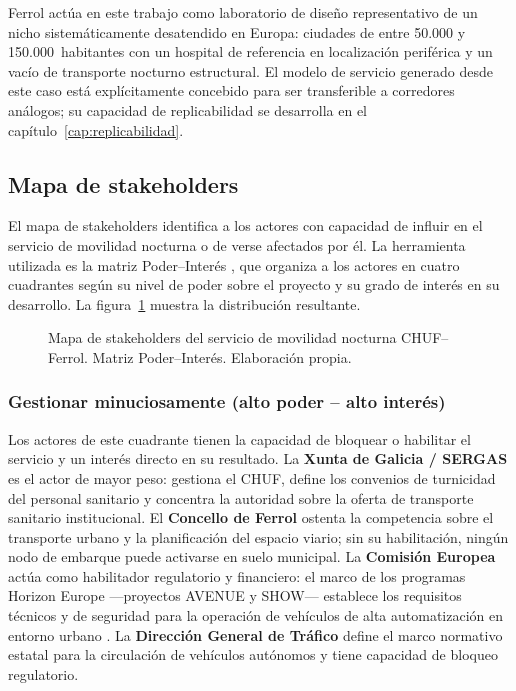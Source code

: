 Ferrol actúa en este trabajo como laboratorio de diseño representativo
de un nicho sistemáticamente desatendido en Europa: ciudades de entre
50.000 y 150.000~habitantes con un hospital de referencia en
localización periférica y un vacío de transporte nocturno estructural.
El modelo de servicio generado desde este caso está explícitamente
concebido para ser transferible a corredores análogos; su capacidad de
replicabilidad se desarrolla en el capítulo~\ref{cap:replicabilidad}.


\subsection{Mapa de stakeholders}
\label{sec:stakeholders}

El mapa de stakeholders identifica a los actores con capacidad de
influir en el servicio de movilidad nocturna o de verse afectados por
él. La herramienta utilizada es la matriz Poder--Interés
\parencite{Mendelow1991}, que organiza a los actores en cuatro cuadrantes según su nivel de poder
sobre el proyecto y su grado de interés en su desarrollo. La
figura~\ref{fig:stakeholder-map} muestra la distribución resultante.

\begin{figure}[htbp]
  \centering
  \fbox{\rule{0pt}{8cm}\rule{0.95\textwidth}{0pt}}
  \caption{Mapa de stakeholders del servicio de movilidad nocturna
    CHUF--Ferrol. Matriz Poder--Interés. Elaboración propia.}
  \label{fig:stakeholder-map}
\end{figure}

\subsubsection{Gestionar minuciosamente (alto poder -- alto interés)}

Los actores de este cuadrante tienen la capacidad de bloquear o
habilitar el servicio y un interés directo en su resultado. La
\textbf{Xunta de Galicia / SERGAS} es el actor de mayor peso: gestiona
el CHUF, define los convenios de turnicidad del personal sanitario
\parencite{XuntaGalicia2025dog} y concentra la autoridad sobre la oferta
de transporte sanitario institucional. El \textbf{Concello de Ferrol}
ostenta la competencia sobre el transporte urbano y la planificación del
espacio viario; sin su habilitación, ningún nodo de embarque puede
activarse en suelo municipal. La \textbf{Comisión Europea} actúa como
habilitador regulatorio y financiero: el marco de los programas Horizon
Europe ---proyectos AVENUE y SHOW--- establece los requisitos técnicos y
de seguridad para la operación de vehículos de alta automatización en
entorno urbano \parencite{AVENUE2023,SHOW2024Legacy}. La \textbf{Dirección
General de Tráfico} define el marco normativo estatal para la circulación
de vehículos autónomos y tiene capacidad de bloqueo regulatorio.

